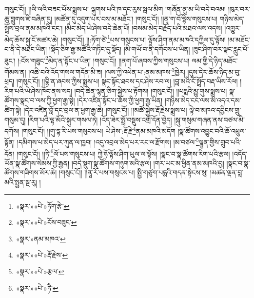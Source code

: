 གསུང་ངོ།། །།ལི་ལའི་བཟང་པོས་སྨྲས་པ། ལྐུགས་པའི་ཁ་དང་རུས་སྦལ་མིག །གཞོན་ནུ་མ་ཡི་བདེ་བའམ། །ཁུར་བར་ཆུ་བླུགས་ཇི་བཞིན་དུ། །མཚོན་དུ་འདུག་པར་ངས་མ་མཐོང་། །གསུང་ངོ།། །།ནཱ་ག་བོ་དྷིས་གསུངས་པ། གཉིས་མེད་སྤྲོས་བྲལ་ནམ་མཁའི་ངང་། །མིང་མེད་ཡེ་ཤེས་བདེ་ཆེན་པོ། །བསམ་མེད་བརྗོད་པའི་མཐའ་ལས་འདས། །འགྱུར་མེད་ཆོས་སྐུ་ངོ་མཚར་ཆེ། །གསུང་ངོ།། །།:ཏོག་ཙེ་\footnote{«སྣར་»«པེ་»ཏོག་རྩེ་}པས་གསུངས་པ། ལྟོས་ཤིག་ནམ་མཁའི་དཀྱིལ་དུ་ལྟོས། །མ་མཐོང་བ་ནི་དེ་མཐོང་ཡིན། །སྡོད་ཅིག་རྒྱ་མཚོའི་གཏིང་དུ་སྡོད། །མི་གཡོ་བ་ནི་དགོངས་པ་ཡིན། །ཟུང་ཤིག་བར་སྣང་རླུང་པོ་ཟུང་། །:ངོས་གཟུང་\footnote{«སྣར་»«པེ་»ངོས་བཟུང་}མེད་ན་སྟོང་པ་ཡིན། །གསུང་ངོ།། །།ནག་པོ་ཞབས་ཀྱིས་གསུངས་པ། ལམ་གྱི་དེ་ཉིད་མཐོང་གོམས་ན། །འཆི་བའི་འོད་གསལ་གདོན་མི་ཟ། །ལས་ཀྱི་འཕེན་པ་:ནམ་མཁས་\footnote{«སྣར་»ནམ་མཁའ་}ཁྱེར། །དུས་དེར་ཆོས་ཉིད་མ་བུ་ཕྲད། །གསུང་ངོ།། །།བྷི་ན་ཞབས་ཀྱིས་སྨྲས་པ། སྣང་སྟོང་ཐབས་དང་ཤེས་རབ་ལ། །བླ་མའི་ངོ་སྤྲོད་བརྡ་ཡིས་རོལ། །རིག་པའི་ཡེ་ཤེས་ཁོང་ནས་སད། །བདེ་ཆེན་ལྷན་ཅིག་སྐྱེས་པ་རྟོགས། །གསུང་ངོ།། །།པདྨའི་མྱུ་གུས་སྨྲས་པ། སྣ་ཚོགས་སྣང་བ་ལས་ཀྱི་ཕྱག་རྒྱ་སྟེ། །དེར་འཛིན་སྟོང་པ་ཆོས་ཀྱི་ཕྱག་རྒྱ་ཡིན། །གཉིས་མེད་ངང་ལས་མི་འདའ་དམ་ཚིག་སྟེ། །དེར་འཛིན་བློ་དང་བྲལ་ན་ཕྱག་རྒྱ་ཆེ། །གསུང་ངོ།། །།མཚོ་སྐྱེས་རྡོ་རྗེས་སྨྲས་པ། ལྟེ་བ་མཁའ་དབྱིངས་གྲུ་གསུམ་དུ། །རིག་པའི་ལྷ་མོའི་སྐུར་གསལ་ཏེ། །འོད་ཟེར་སྤྲོ་བསྡུས་འགྲོ་དོན་བྱེད། །སྐུ་གསུམ་གཞན་ནས་བཙལ་མི་དགོས། །གསུང་ངོ།། །།གུ་དྷ་རི་པས་གསུངས་པ། ཡེ་ཤེས་:རྡོ་རྗེ་\footnote{«སྣར་»«པེ་»རྡོ་རྗེས་}ནམ་མཁའི་མདོག །སྣ་ཚོགས་འབྱུང་བའི་ཆོ་འཕྲུལ་སྟོན། །དམིགས་པ་མེད་པར་ཀུན་ལ་ཁྱབ། །འདུ་འབྲལ་མེད་པར་རང་ལ་རྫོགས། །མ་བཙལ་\footnote{«སྣར་»«པེ་»རྩལ་}ལྷུན་གྱིས་གྲུབ་པའི་དོན། །གསུང་ངོ།། །།ཏི་\footnote{«སྣར་»«པེ་»ཏཻ་}ལོ་པས་གསུངས་པ། ཀྱེ་ཧོ་ལྟོས་ཤིག་ཡུལ་ལ་ལྟོས། །སྣང་བ་སྣ་ཚོགས་རིག་པའི་རྩལ། །འདོད་ཡོན་སྣ་ཚོགས་སེམས་ཀྱི་རྒྱན། །བདེ་སྡུག་སྣ་ཚོགས་གཉུག་མའི་རྩལ། །གར་ཡང་མ་ཕྱིན་ནམ་མཁའི་བྱ། །སྣང་བ་སྣ་ཚོགས་གཟིགས་མོར་ཆེ། །གསུང་ངོ།། །།ནཱ་རོ་པས་གསུངས་པ། སྤྱི་གཙུག་པདྨའི་གདན་སྟེངས་སུ། །མཚན་ལྡན་བླ་མའི་སྤྱན་སྔ་རུ། །
